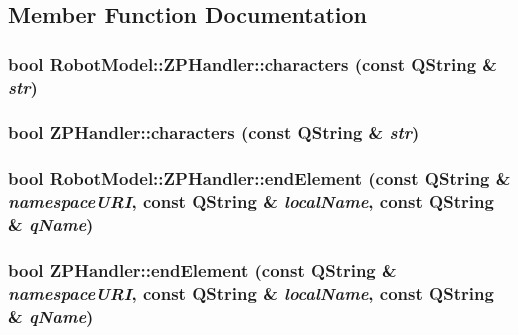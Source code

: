 \subsection{Member Function Documentation}
\hypertarget{class_robot_model_1_1_z_p_handler_af3771144675a93929a3926bafbad2a99}{
\subsubsection[{characters}]{\setlength{\rightskip}{0pt plus 5cm}bool RobotModel::ZPHandler::characters (const QString \& {\em str})}}
\label{class_robot_model_1_1_z_p_handler_af3771144675a93929a3926bafbad2a99}
\hypertarget{class_robot_model_1_1_z_p_handler_a246f066600bede52d4321d0ccebd5cec}{
\subsubsection[{characters}]{\setlength{\rightskip}{0pt plus 5cm}bool ZPHandler::characters (const QString \& {\em str})}}
\label{class_robot_model_1_1_z_p_handler_a246f066600bede52d4321d0ccebd5cec}
\hypertarget{class_robot_model_1_1_z_p_handler_ae58bf36c338a6c4c7cc021d0e0534c5c}{
\subsubsection[{endElement}]{\setlength{\rightskip}{0pt plus 5cm}bool RobotModel::ZPHandler::endElement (const QString \& {\em namespaceURI}, \/  const QString \& {\em localName}, \/  const QString \& {\em qName})}}
\label{class_robot_model_1_1_z_p_handler_ae58bf36c338a6c4c7cc021d0e0534c5c}
\hypertarget{class_robot_model_1_1_z_p_handler_ab058af372b5178f8877907ee45b8257d}{
\subsubsection[{endElement}]{\setlength{\rightskip}{0pt plus 5cm}bool ZPHandler::endElement (const QString \& {\em namespaceURI}, \/  const QString \& {\em localName}, \/  const QString \& {\em qName})}}
